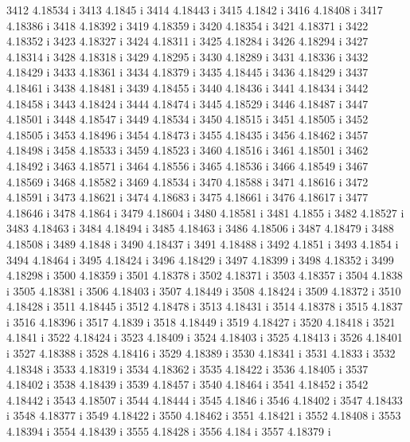  3412  4.18534  i
 3413  4.1845  i
 3414  4.18443  i
 3415  4.1842  i
 3416  4.18408  i
 3417  4.18386  i
 3418  4.18392  i
 3419  4.18359  i
 3420  4.18354  i
 3421  4.18371  i
 3422  4.18352  i
 3423  4.18327  i
 3424  4.18311  i
 3425  4.18284  i
 3426  4.18294  i
 3427  4.18314  i
 3428  4.18318  i
 3429  4.18295  i
 3430  4.18289  i
 3431  4.18336  i
 3432  4.18429  i
 3433  4.18361  i
 3434  4.18379  i
 3435  4.18445  i
 3436  4.18429  i
 3437  4.18461  i
 3438  4.18481  i
 3439  4.18455  i
 3440  4.18436  i
 3441  4.18434  i
 3442  4.18458  i
 3443  4.18424  i
 3444  4.18474  i
 3445  4.18529  i
 3446  4.18487  i
 3447  4.18501  i
 3448  4.18547  i
 3449  4.18534  i
 3450  4.18515  i
 3451  4.18505  i
 3452  4.18505  i
 3453  4.18496  i
 3454  4.18473  i
 3455  4.18435  i
 3456  4.18462  i
 3457  4.18498  i
 3458  4.18533  i
 3459  4.18523  i
 3460  4.18516  i
 3461  4.18501  i
 3462  4.18492  i
 3463  4.18571  i
 3464  4.18556  i
 3465  4.18536  i
 3466  4.18549  i
 3467  4.18569  i
 3468  4.18582  i
 3469  4.18534  i
 3470  4.18588  i
 3471  4.18616  i
 3472  4.18591  i
 3473  4.18621  i
 3474  4.18683  i
 3475  4.18661  i
 3476  4.18617  i
 3477  4.18646  i
 3478  4.1864  i
 3479  4.18604  i
 3480  4.18581  i
 3481  4.1855  i
 3482  4.18527  i
 3483  4.18463  i
 3484  4.18494  i
 3485  4.18463  i
 3486  4.18506  i
 3487  4.18479  i
 3488  4.18508  i
 3489  4.1848  i
 3490  4.18437  i
 3491  4.18488  i
 3492  4.1851  i
 3493  4.1854  i
 3494  4.18464  i
 3495  4.18424  i
 3496  4.18429  i
 3497  4.18399  i
 3498  4.18352  i
 3499  4.18298  i
 3500  4.18359  i
 3501  4.18378  i
 3502  4.18371  i
 3503  4.18357  i
 3504  4.1838  i
 3505  4.18381  i
 3506  4.18403  i
 3507  4.18449  i
 3508  4.18424  i
 3509  4.18372  i
 3510  4.18428  i
 3511  4.18445  i
 3512  4.18478  i
 3513  4.18431  i
 3514  4.18378  i
 3515  4.1837  i
 3516  4.18396  i
 3517  4.1839  i
 3518  4.18449  i
 3519  4.18427  i
 3520  4.18418  i
 3521  4.1841  i
 3522  4.18424  i
 3523  4.18409  i
 3524  4.18403  i
 3525  4.18413  i
 3526  4.18401  i
 3527  4.18388  i
 3528  4.18416  i
 3529  4.18389  i
 3530  4.18341  i
 3531  4.1833  i
 3532  4.18348  i
 3533  4.18319  i
 3534  4.18362  i
 3535  4.18422  i
 3536  4.18405  i
 3537  4.18402  i
 3538  4.18439  i
 3539  4.18457  i
 3540  4.18464  i
 3541  4.18452  i
 3542  4.18442  i
 3543  4.18507  i
 3544  4.18444  i
 3545  4.1846  i
 3546  4.18402  i
 3547  4.18433  i
 3548  4.18377  i
 3549  4.18422  i
 3550  4.18462  i
 3551  4.18421  i
 3552  4.18408  i
 3553  4.18394  i
 3554  4.18439  i
 3555  4.18428  i
 3556  4.184  i
 3557  4.18379  i
